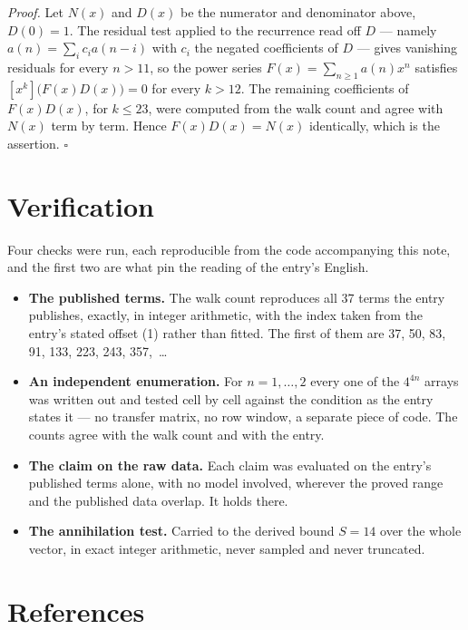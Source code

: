 \documentclass[11pt]{article}
\theoremstyle{definition}
\begin{document}
{\itshape Proof.} Let $N(x)$ and $D(x)$ be the numerator and denominator above, $D(0)=1$. The residual test applied to the recurrence read off $D$ --- namely $a(n) = \sum_i c_i a(n-i)$ with $c_i$ the negated coefficients of $D$ --- gives vanishing residuals for every $n > 11$, so the power series $F(x)=\sum_{n\ge 1}a(n)x^n$ satisfies $[x^k]\bigl(F(x)D(x)\bigr) = 0$ for every $k > 12$. The remaining coefficients of $F(x)D(x)$, for $k \le 23$, were computed from the walk count and agree with $N(x)$ term by term. Hence $F(x)D(x) = N(x)$ identically, which is the assertion. $\square$

\section{Verification}

Four checks were run, each reproducible from the code accompanying this note, and the first two are what pin the reading of the entry's English.

\begin{itemize}

\item {\bfseries The published terms.} The walk count reproduces all 37 terms the entry publishes, exactly, in integer arithmetic, with the index taken from the entry's stated offset (1) rather than fitted. The first of them are 37, 50, 83, 91, 133, 223, 243, 357,~\dots

\item {\bfseries An independent enumeration.} For $n = 1,\dots,2$ every one of the $4^{4n}$ arrays was written out and tested cell by cell against the condition as the entry states it --- no transfer matrix, no row window, a separate piece of code. The counts agree with the walk count and with the entry.

\item {\bfseries The claim on the raw data.} Each claim was evaluated on the entry's published terms alone, with no model involved, wherever the proved range and the published data overlap. It holds there.

\item {\bfseries The annihilation test.} Carried to the derived bound $S = 14$ over the whole vector, in exact integer arithmetic, never sampled and never truncated.

\end{itemize}

\section{References}
\end{document}
